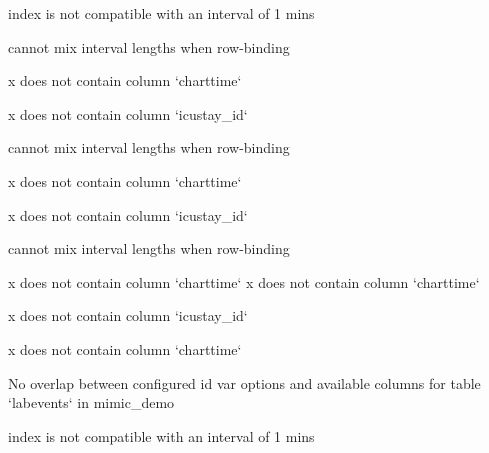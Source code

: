 \documentclass[
]{jss}
\begin{document}
\begin{CodeChunk}
\begin{CodeOutput}
index is not compatible with an interval of 1 mins
\end{CodeOutput}

\begin{CodeOutput}
cannot mix interval lengths when row-binding
\end{CodeOutput}

\begin{CodeOutput}
x does not contain column `charttime`
\end{CodeOutput}

\begin{CodeOutput}
x does not contain column `icustay_id`
\end{CodeOutput}

\begin{CodeOutput}
cannot mix interval lengths when row-binding
\end{CodeOutput}

\begin{CodeOutput}
x does not contain column `charttime`
\end{CodeOutput}

\begin{CodeOutput}
x does not contain column `icustay_id`
\end{CodeOutput}

\begin{CodeOutput}
cannot mix interval lengths when row-binding
\end{CodeOutput}

\begin{CodeOutput}
x does not contain column `charttime`
x does not contain column `charttime`
\end{CodeOutput}

\begin{CodeOutput}
x does not contain column `icustay_id`
\end{CodeOutput}

\begin{CodeOutput}
x does not contain column `charttime`
\end{CodeOutput}

\begin{CodeOutput}
No overlap between configured id var options and available columns for table
`labevents` in mimic_demo
\end{CodeOutput}

\begin{CodeOutput}
index is not compatible with an interval of 1 mins
\end{CodeOutput}


\end{CodeChunk}
\end{document}

